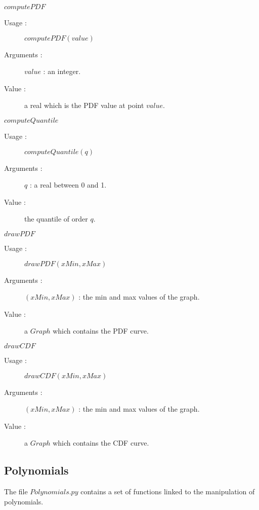 \begin{description}
\begin{description}
  \item $computePDF$
    \begin{description}
    \item[Usage :] $computePDF(value)$
    \item[Arguments :]  $value$ : an integer.
    \item[Value :]  a real which is the PDF value at point $value$.
    \end{description}
    \bigskip

  \item $computeQuantile$
    \begin{description}
    \item[Usage :] $computeQuantile(q)$
    \item[Arguments :]  $q$ : a real between 0 and 1. 
    \item[Value :]  the quantile of order $q$.
    \end{description}
    \bigskip


  \item $drawPDF$
    \begin{description}
    \item[Usage :] $drawPDF(xMin, xMax)$
    \item[Arguments :] $(xMin, xMax)$ : the min and max values of the graph.
    \item[Value :]  a $Graph$ which contains the PDF curve.
    \end{description}
    \bigskip


  \item $drawCDF$
    \begin{description}
    \item[Usage :] $drawCDF(xMin, xMax)$
    \item[Arguments :] $(xMin, xMax)$ : the min and max values of the graph.
    \item[Value :]  a $Graph$ which contains the CDF curve.
    \end{description}

    \end{description}
 
\end{description}



\subsection{Polynomials}

The file $Polynomials.py$ contains a set of functions linked to the manipulation of polynomials.



